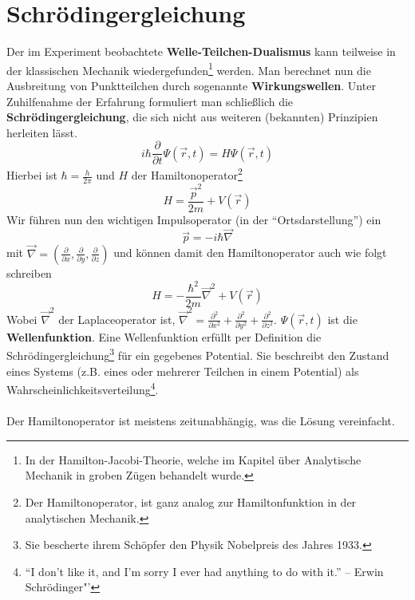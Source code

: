\documentclass[oneside]{book}
\theoremstyle{definition}
\newcommand{\fpartial}[1]{\frac{\partial}{\partial #1}}
\newcommand{\ffpartial}[2]{\frac{\partial #1}{\partial #2}}
\begin{document}
\section{Schrödingergleichung}
Der im Experiment beobachtete \textbf{Welle-Teilchen-Dualismus} kann teilweise in der klassischen Mechanik wiedergefunden\footnote{In der Hamilton-Jacobi-Theorie, welche im Kapitel über Analytische Mechanik in groben Zügen behandelt wurde.} werden. Man berechnet nun die Ausbreitung von Punktteilchen durch sogenannte \textbf{Wirkungswellen}. Unter Zuhilfenahme der Erfahrung formuliert man schließlich die \textbf{Schrödingergleichung}, die sich nicht aus weiteren (bekannten) Prinzipien herleiten lässt.
$$i \hbar \fpartial{t} \Psi(\vec{r}, t) = H \Psi(\vec{r}, t)$$
Hierbei ist $\hbar = \frac{h}{2 \pi}$ und $H$ der Hamiltonoperator\footnote{Der Hamiltonoperator, ist ganz analog zur Hamiltonfunktion in der analytischen Mechanik.}
$$H = \frac{\vec{p}^2}{2m} + V(\vec{r})$$
Wir führen nun den wichtigen Impulsoperator (in der "`Ortsdarstellung"') ein
$$\vec{p} = - i \hbar \vec{\nabla}$$
mit $\vec{\nabla} = (\fpartial{x}, \fpartial{y}, \fpartial{z})$ und können damit den Hamiltonoperator auch wie folgt schreiben
$$H = - \frac{\hbar^2}{2m} \vec{\nabla}^2 + V(\vec{r})$$
Wobei $\vec{\nabla}^2$ der Laplaceoperator ist, $\vec{\nabla}^2 = \ffpartial{^2}{x^2} +\ffpartial{^2}{y^2} + \ffpartial{^2}{z^2}$.
$\Psi(\vec{r}, t)$ ist die \textbf{Wellenfunktion}. Eine Wellenfunktion erfüllt per Definition die Schrödingergleichung\footnote{Sie bescherte ihrem Schöpfer den Physik Nobelpreis des Jahres 1933.} für ein gegebenes Potential. Sie beschreibt den Zustand eines Systems (z.B. eines oder mehrerer Teilchen in einem Potential) als Wahrscheinlichkeitsverteilung\footnote{"`I don't like it, and I'm sorry I ever had anything to do with it."' – Erwin Schrödinger"'}. \\
~\\
Der Hamiltonoperator ist meistens zeitunabhängig, was die Lösung vereinfacht. 
\end{document}
